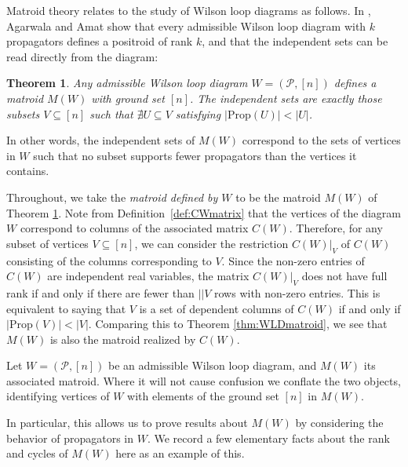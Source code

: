 \documentclass[11pt]{article}
\newcommand{\cP}{\mathcal{P}}
\newcommand{\Prop}{\textrm{Prop}}
\newtheorem{thm}{Theorem}[section]
\theoremstyle{remark}
\theoremstyle{definition}
\begin{document}
Matroid theory relates to the study of Wilson loop diagrams as follows. In \cite{wilsonloop}, Agarwala and Amat show that every admissible Wilson loop diagram with $k$ propagators defines a positroid of rank $k$, and that the independent sets can be read directly from the diagram:

\begin{thm} \label{thm WLD defines matroid} \cite[Theorem 3.6]{wilsonloop} Any admissible Wilson loop diagram $W =(\cP, [n])$ defines a matroid $M(W)$ with ground set $[n]$. The independent sets are exactly those subsets $V \subseteq [n]$ such that $\nexists U\subseteq V$ satisfying $|\Prop(U)| < |U|$. \label{thm:WLDmatroid}\end{thm}
In other words, the independent sets of $M(W)$ correspond to the sets of vertices in $W$ such that no subset supports fewer propagators than the vertices it contains.

Throughout, we take the {\em matroid defined by $W$} to be the matroid $M(W)$ of Theorem \ref{thm WLD defines matroid}. Note from Definition~\ref{def:CWmatrix} that the vertices of the diagram $W$ correspond to columns of the associated matrix $C(W)$. Therefore, for any subset of vertices $V \subseteq [n]$, we can consider the restriction $C(W)|_V$ of $C(W)$ consisting of the columns corresponding to $V$. Since the non-zero entries of $C(W)$ are independent real variables, the matrix $C(W)|_V$ does not have full rank if and only if there are fewer than $||V$ rows with non-zero entries. This is equivalent to saying that $V$ is a set of dependent columns of $C(W)$ if and only if $|\Prop(V)| < |V|$. Comparing this to Theorem \ref{thm:WLDmatroid}, we see that $M(W)$ is also the matroid realized by $C(W)$.




Let $W = (\cP,[n])$ be an admissible Wilson loop diagram, and $M(W)$ its associated matroid. Where it will not cause confusion we conflate the two objects, identifying vertices of $W$ with elements of the ground set $[n]$ in $M(W)$. 

In particular, this allows us to prove results about $M(W)$ by considering the behavior of propagators in $W$. We record a few elementary facts about the rank and cycles of $M(W)$ here as an example of this.
\end{document}
